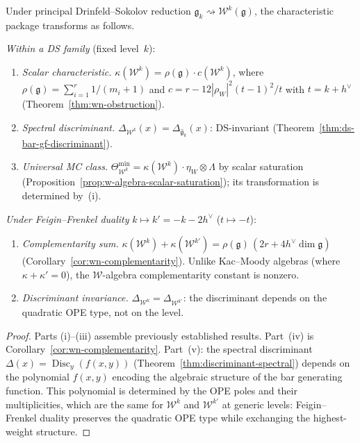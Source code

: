 \begin{proposition}
\label{prop:ds-package-functoriality}
Under principal Drinfeld--Sokolov reduction
$\widehat{\mathfrak{g}}_k \rightsquigarrow
\mathcal{W}^k(\mathfrak{g})$, the characteristic package
transforms as follows.

\smallskip\noindent
\emph{Within a DS family} (fixed level~$k$):
\begin{enumerate}[label=\textup{(\roman*)}]
\item \emph{Scalar characteristic.}
  $\kappa(\mathcal{W}^k) = \rho(\mathfrak{g}) \cdot c(\mathcal{W}^k)$,
  where $\rho(\mathfrak{g}) = \sum_{i=1}^{r} 1/(m_i + 1)$
  and $c = r - 12|\rho_W|^2(t-1)^2/t$ with $t = k + h^\vee$
  \textup{(}Theorem~\textup{\ref{thm:wn-obstruction}}\textup{)}.
\item \emph{Spectral discriminant.}
  $\Delta_{\mathcal{W}^k}(x)$\allowbreak${} = \Delta_{\widehat{\mathfrak{g}}_k}(x)$:
  DS-invariant
  \textup{(}Theorem~\textup{\ref{thm:ds-bar-gf-discriminant}}\textup{)}.
\item \emph{Universal MC class.}
  $\Theta_{\mathcal{W}^k}^{\min}
  = \kappa(\mathcal{W}^k) \cdot \eta_W \otimes \Lambda$
  by scalar saturation
  \textup{(}Proposition~\textup{\ref{prop:w-algebra-scalar-saturation}}\textup{)};
  its transformation is determined by~\textup{(i)}.
\end{enumerate}

\smallskip\noindent
\emph{Under Feigin--Frenkel duality}
$k \mapsto k' = -k - 2h^\vee$ ($t \mapsto -t$):
\begin{enumerate}[label=\textup{(\roman*)},start=4]
\item \emph{Complementarity sum.}
  $\kappa(\mathcal{W}^k) + \kappa(\mathcal{W}^{k'})
  = \rho(\mathfrak{g})\,(2r + 4h^\vee\dim\mathfrak{g})$
  \textup{(}Corollary~\textup{\ref{cor:wn-complementarity}}\textup{)}.
  Unlike Kac--Moody algebras (where $\kappa + \kappa' = 0$),
  the $\mathcal{W}$-algebra complementarity constant is nonzero.
\item \emph{Discriminant invariance.}
  $\Delta_{\mathcal{W}^k} = \Delta_{\mathcal{W}^{k'}}$:
  the discriminant depends on the quadratic OPE type, not
  on the level.
\end{enumerate}
\end{proposition}

\begin{proof}
Parts (i)--(iii) assemble previously established results.
Part~(iv) is
Corollary~\ref{cor:wn-complementarity}.
Part~(v): the spectral discriminant
$\Delta(x) = \operatorname{Disc}_y(f(x,y))$
(Theorem~\ref{thm:discriminant-spectral})
depends on the polynomial $f(x,y)$ encoding the algebraic
structure of the bar generating function.  This polynomial
is determined by the OPE poles and their multiplicities,
which are the same for $\mathcal{W}^k$ and $\mathcal{W}^{k'}$
at generic levels: Feigin--Frenkel duality preserves the
quadratic OPE type while exchanging the highest-weight structure.
\end{proof}

